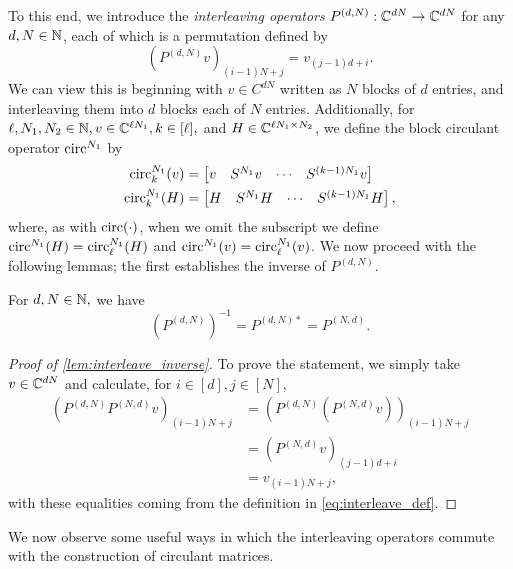 To this end, we introduce the \emph{interleaving operators} $P^{(d, N)} : \mathbb{C}^{dN} \to \mathbb{C}^{dN}$ for any $d, N \in \mathbb{N}$, each of which is a permutation defined by \begin{equation} (P^{(d, N)} v)_{(i - 1)N + j} = v_{(j - 1)d + i}.\label{eq:interleave_def}\end{equation}  We can view this is beginning with $v \in C^{dN}$ written as $N$ blocks of $d$ entries, and interleaving them into $d$ blocks each of $N$ entries.  Additionally, for $\ell, N_1, N_2 \in \mathbb{N}, v \in \mathbb{C}^{\ell N_1}, k \in [\ell],$ and $H \in \mathbb{C}^{\ell N_1 \times N_2}$, we define the block circulant operator $\operatorname{circ}^{N_1}$ by
\begin{align*}
  \operatorname{circ}_k^{N_1}(v) &= \begin{bmatrix} v & S^{N_1} v & \cdots & S^{(k - 1)N_1} v \end{bmatrix} \\
  \operatorname{circ}_k^{N_1}(H) &= \begin{bmatrix} H & S^{N_1} H & \cdots & S^{(k - 1) N_1}H \end{bmatrix},
\end{align*}
where, as with $\operatorname{circ}(\cdot)$, when we omit the subscript we define $\operatorname{circ}^{N_1}(H) = \operatorname{circ}_\ell^{N_1}(H)$ and $\operatorname{circ}^{N_1}(v) = \operatorname{circ}_\ell^{N_1}(v)$.  We now proceed with the following lemmas; the first establishes the inverse of $P^{(d, N)}$.

\begin{lemma} \label{lem:interleave_inverse}
  For $d, N \in \mathbb{N},$ we have \[(P^{(d, N)})^{-1} = P^{(d, N) *} = P^{(N, d)}.\]
\end{lemma}

\begin{proof}[Proof of \cref{lem:interleave_inverse}]
  To prove the statement, we simply take $v \in \mathbb{C}^{d N}$ and calculate, for $i \in [d], j \in [N]$,
  \begin{align*}
    (P^{(d, N)} P^{(N, d)} v)_{(i - 1) N + j} &= (P^{(d, N)} (P^{(N, d)} v))_{(i - 1) N + j} \\
    &= (P^{(N, d)} v)_{(j - 1) d + i} \\
    &= v_{(i - 1) N + j},
  \end{align*}
  with these equalities coming from the definition in \eqref{eq:interleave_def}.  
\end{proof}

We now observe some useful ways in which the interleaving operators commute with the construction of circulant matrices.

